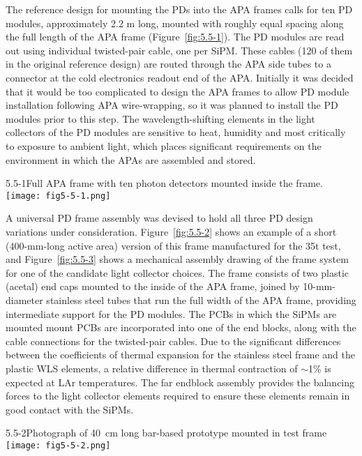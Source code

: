 The reference design for mounting the PDs into the APA frames calls
for ten PD modules, approximately 2.2 m long, mounted with roughly
equal spacing along the full length of the APA frame
(Figure~\ref{fig:5.5-1}).  The PD modules are read out using
individual twisted-pair cable, one per SiPM.  These cables (120 of
them in the original reference design) are routed through the APA side
tubes to a connector at the cold electronics readout end of the APA.
Initially it was decided that it would be too complicated to design
the APA frames to allow PD module installation following APA
wire-wrapping, so it was planned to install the PD modules prior to
this step.  The wavelength-shifting elements in the light collectors
of the PD modules are sensitive to heat, humidity and most critically
to exposure to ambient light, which places significant requirements on
the environment in which the APAs are assembled and stored.

\begin{cdrfigure}{5.5-1}{Full APA frame with ten photon detectors mounted
  inside the frame.}
   \texttt{[image: fig5-5-1.png]}
\end{cdrfigure}

A universal PD frame assembly was devised to hold all three PD design
variations under consideration.  Figure~\ref{fig:5.5-2} shows an
example of a short (400-mm-long active area) version of this frame
manufactured for the 35t test, and Figure~\ref{fig:5.5-3} shows a
mechanical assembly drawing of the frame system for one of the
candidate light collector choices.  The frame consists of two plastic
(acetal) end caps mounted to the inside of the APA frame, joined by
10-mm-diameter stainless steel tubes that run the full width of the
APA frame, providing intermediate support for the PD modules.  The
PCBs in which the SiPMs are mounted mount PCBs are incorporated into
one of the end blocks, along with the cable connections for the
twisted-pair cables.  Due to the significant differences between the
coefficients of thermal expansion for the stainless steel frame and
the plastic WLS elements, a relative difference in thermal contraction
of $\sim$1\% is expected at LAr temperatures.  The far endblock
assembly provides the balancing forces to the light collector elements
required to ensure these elements remain in good contact with the
SiPMs.

\begin{cdrfigure}{5.5-2}{Photograph of 40~cm long bar-based prototype mounted in test frame}
  \texttt{[image: fig5-5-2.png]}
\end{cdrfigure}

